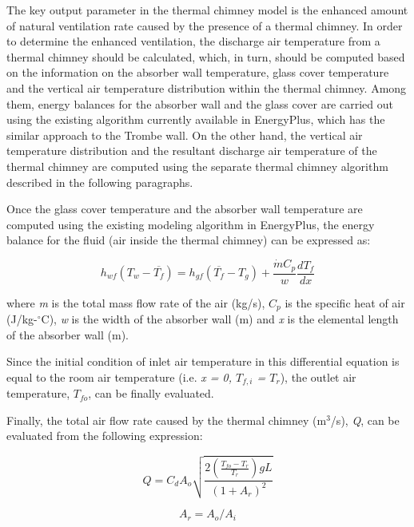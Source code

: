 The key output parameter in the thermal chimney model is the enhanced amount of natural ventilation rate caused by the presence of a thermal chimney. In order to determine the enhanced ventilation, the discharge air temperature from a thermal chimney should be calculated, which, in turn, should be computed based on the information on the absorber wall temperature, glass cover temperature and the vertical air temperature distribution within the thermal chimney. Among them, energy balances for the absorber wall and the glass cover are carried out using the existing algorithm currently available in EnergyPlus, which has the similar approach to the Trombe wall. On the other hand, the vertical air temperature distribution and the resultant discharge air temperature of the thermal chimney are computed using the separate thermal chimney algorithm described in the following paragraphs.

Once the glass cover temperature and the absorber wall temperature are computed using the existing modeling algorithm in EnergyPlus, the energy balance for the fluid (air inside the thermal chimney) can be expressed as:

\begin{equation}
{h_{wf}}({T_w} - \overline {{T_f}} ) = {h_{gf}}(\overline {{T_f}}  - {T_g}) + \frac{{\dot m{C_p}}}{w}\frac{{d{T_f}}}{{dx}}
\end{equation}

where \emph{m} is the total mass flow rate of the air (kg/s), \(C_{p}\) is the specific heat of air (J/kg-\(^{\circ}\)C), \emph{w} is the width of the absorber wall (m) and \emph{x} is the elemental length of the absorber wall (m).

Since the initial condition of inlet air temperature in this differential equation is equal to the room air temperature (i.e. \emph{x = 0, \(T_{f,i}\) = \(T_{r}\)}), the outlet air temperature, \(T_{fo}\), can be finally evaluated.

Finally, the total air flow rate caused by the thermal chimney (m\(^{3}\)/s), \emph{Q}, can be evaluated from the following expression:

\begin{equation}
Q = {C_d}{A_o}\sqrt {\frac{{2(\frac{{{T_{fo}} - {T_r}}}{{{T_r}}})gL}}{{{{(1 + {A_r})}^2}}}}
\end{equation}

\begin{equation}
{A_r} = {A_o}/{A_i}
\end{equation}

